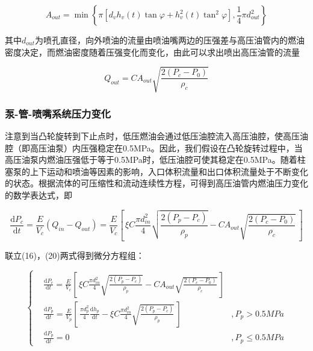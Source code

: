 \documentclass[withoutpreface,bwprint]{cumcmthesis} %
\begin{document}
			\begin{equation}A_{out} = \min\left\{ \pi[d_v h_v(t) \tan \varphi + h_v^2(t) \tan^2\varphi ], \frac{1}{4} \pi d_{out}^2 \right\}\end{equation}
			
			其中$d_{out}$为喷孔直径，向外喷油的流量由喷油嘴两边的压强差与高压油管内的燃油密度决定，而燃油密度随着压强变化而变化，由此可以求出喷出高压油管的流量
			
			\begin{equation}Q_{out} = CA_{out} \sqrt{\frac{2(P_c - P_0)}{\rho_c}}\end{equation}
			
			
			
			\subsubsection{泵-管-喷嘴系统压力变化}
			
			注意到当凸轮旋转到下止点时，低压燃油会通过低压油腔流入高压油腔，使高压油腔（即高压油泵）内压强稳定在0.5MPa。因此，我们假设在凸轮旋转过程中，当高压油泵内燃油压强低于等于0.5MPa时，低压油腔可使其稳定在0.5MPa。随着柱塞泵的上下运动和喷油等因素的影响，入口体积流量和出口体积流量处于不断变化的状态。根据流体的可压缩性和流动连续性方程，可得到高压油管内燃油压力变化的数学表达式，即
			
			\begin{equation}\frac{\mathrm{d}P_c}{\mathrm{d}t} = \frac{E}{V_c}(Q_{in} - Q_{out}) = \frac{E}{V_c} \left[ \, \xi C \frac{\pi d_{in}^2}{4} \sqrt{\frac{2(P_p - P_c)}{\rho_p}} - CA_{out} \sqrt{\frac{2(P_c - P_0)}{\rho_c}} \, \right]\end{equation}
			
			联立(16)，(20)两式得到微分方程组：
			
			\begin{equation} \left\{
			\begin{aligned}
			&\frac{\mathrm{d}P_c}{\mathrm{d}t} = \frac{E}{V_c} \left[ \, \xi C \frac{\pi d_{in}^2}{4} \sqrt{\frac{2(P_p - P_c)}{\rho_p}} - CA_{out} \sqrt{\frac{2(P_c - P_0)}{\rho_c}} \, \right]& \\
			&\frac{\mathrm{d}P_p}{\mathrm{d}t} = \frac{E}{V_p} \left[ \, \frac{\pi d_p^2}{4}  \frac{\mathrm{d}h_p}{\mathrm{d}t} - \xi C \frac{\pi d_{in}^2}{4} \sqrt{\frac{2(P_p - P_c)}{\rho_p}} \, \right]&,P_p>0.5MPa \\
			&\frac{\mathrm{d}P_p}{\mathrm{d}t} = 0&,P_p\leq 0.5MPa
			\end{aligned}\right. 
			\end{equation}
			
\end{document}
